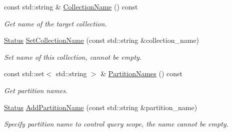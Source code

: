 \begin{DoxyCompactItemize}
\item 
\mbox{\label{classmilvus_1_1_query_arguments_a416be756508349aa00e1dda7274602c7}} 
const std\+::string \& \hyperlink{classmilvus_1_1_query_arguments_a416be756508349aa00e1dda7274602c7}{Collection\+Name} () const
\begin{DoxyCompactList}\small\item\em Get name of the target collection. \end{DoxyCompactList}\item 
\mbox{\label{classmilvus_1_1_query_arguments_ab22ac8a6ea43f235be7ac34f7e80536a}} 
\hyperlink{classmilvus_1_1_status}{Status} \hyperlink{classmilvus_1_1_query_arguments_ab22ac8a6ea43f235be7ac34f7e80536a}{Set\+Collection\+Name} (const std\+::string \&collection\+\_\+name)
\begin{DoxyCompactList}\small\item\em Set name of this collection, cannot be empty. \end{DoxyCompactList}\item 
\mbox{\label{classmilvus_1_1_query_arguments_ae80f29c55ba3039d968df772a0b51f64}} 
const std\+::set$<$ std\+::string $>$ \& \hyperlink{classmilvus_1_1_query_arguments_ae80f29c55ba3039d968df772a0b51f64}{Partition\+Names} () const
\begin{DoxyCompactList}\small\item\em Get partition names. \end{DoxyCompactList}\item 
\mbox{\label{classmilvus_1_1_query_arguments_adcc03a1d8834de6ac0c33e72f06c62f3}} 
\hyperlink{classmilvus_1_1_status}{Status} \hyperlink{classmilvus_1_1_query_arguments_adcc03a1d8834de6ac0c33e72f06c62f3}{Add\+Partition\+Name} (const std\+::string \&partition\+\_\+name)
\begin{DoxyCompactList}\small\item\em Specify partition name to control query scope, the name cannot be empty. \end{DoxyCompactList}\item 
\mbox{\label{classmilvus_1_1_query_arguments_a31fb09de17771c1dad8bb550882193f1}} 

\end{DoxyCompactItemize}
